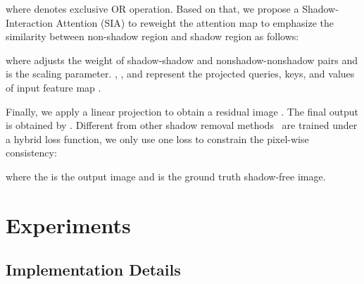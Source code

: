 \documentclass[letterpaper]{article} \usepackage{aaai23}  \usepackage{times}  \usepackage{helvet}  \usepackage{courier}  \usepackage[hyphens]{url}  \usepackage{graphicx} \urlstyle{rm} \def\UrlFont{\rm}  \usepackage{natbib}  \usepackage{caption} \frenchspacing  \setlength{\pdfpagewidth}{8.5in} \setlength{\pdfpageheight}{11in} \usepackage{algorithm}
\begin{document}
where  denotes exclusive OR operation. 
Based on that, we propose a Shadow-Interaction Attention (SIA) to reweight the attention map to emphasize the similarity between non-shadow region and shadow region as follows:

where  adjusts the weight of shadow-shadow and nonshadow-nonshadow pairs and  is the scaling parameter. , , and  represent the projected queries, keys, and values of input feature map .

Finally, we apply a linear projection to obtain a residual image . The final output is obtained by .
Different from other shadow removal methods~\cite{fu2021auto,chen2021canet,zhu2022efficient} are trained under a hybrid loss function, we only use one  loss to constrain the pixel-wise consistency:

where the  is the output image and  is the ground truth shadow-free image. 


\section{Experiments}
\subsection{Implementation Details}
\end{document}
